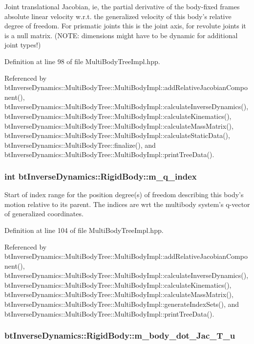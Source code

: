 Joint translational Jacobian, ie, the partial derivative of the body-fixed frames absolute linear velocity w.r.t. the generalized velocity of this body's relative degree of freedom. For prismatic joints this is the joint axis, for revolute joints it is a null matrix. (NOTE: dimensions might have to be dynamic for additional joint types!) 

Definition at line 98 of file MultiBodyTreeImpl.hpp.

Referenced by btInverseDynamics::MultiBodyTree::MultiBodyImpl::addRelativeJacobianComponent(), btInverseDynamics::MultiBodyTree::MultiBodyImpl::calculateInverseDynamics(), btInverseDynamics::MultiBodyTree::MultiBodyImpl::calculateKinematics(), btInverseDynamics::MultiBodyTree::MultiBodyImpl::calculateMassMatrix(), btInverseDynamics::MultiBodyTree::MultiBodyImpl::calculateStaticData(), btInverseDynamics::MultiBodyTree::finalize(), and btInverseDynamics::MultiBodyTree::MultiBodyImpl::printTreeData().\hypertarget{structbt_inverse_dynamics_1_1_rigid_body_33784734bb817b0f117e5cc59f8e2d07}{
\subsubsection[m\_\-q\_\-index]{\setlength{\rightskip}{0pt plus 5cm}int {\bf btInverseDynamics::RigidBody::m\_\-q\_\-index}}}
\label{structbt_inverse_dynamics_1_1_rigid_body_33784734bb817b0f117e5cc59f8e2d07}


Start of index range for the position degree(s) of freedom describing this body's motion relative to its parent. The indices are wrt the multibody system's q-vector of generalized coordinates. 

Definition at line 104 of file MultiBodyTreeImpl.hpp.

Referenced by btInverseDynamics::MultiBodyTree::MultiBodyImpl::addRelativeJacobianComponent(), btInverseDynamics::MultiBodyTree::MultiBodyImpl::calculateInverseDynamics(), btInverseDynamics::MultiBodyTree::MultiBodyImpl::calculateKinematics(), btInverseDynamics::MultiBodyTree::MultiBodyImpl::calculateMassMatrix(), btInverseDynamics::MultiBodyTree::MultiBodyImpl::generateIndexSets(), and btInverseDynamics::MultiBodyTree::MultiBodyImpl::printTreeData().\hypertarget{structbt_inverse_dynamics_1_1_rigid_body_5b544206431b83f7e8f72004add66029}{
\subsubsection[m\_\-body\_\-dot\_\-Jac\_\-T\_\-u]{ {\bf btInverseDynamics::RigidBody::m\_\-body\_\-dot\_\-Jac\_\-T\_\-u}}}
\label{structbt_inverse_dynamics_1_1_rigid_body_5b544206431b83f7e8f72004add66029}


